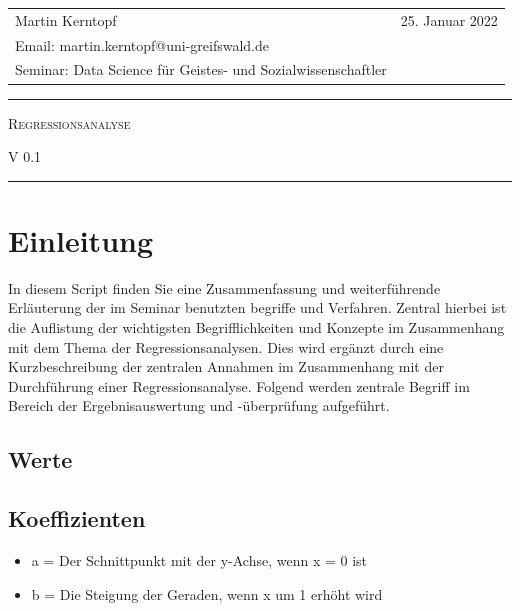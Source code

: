 \documentclass[10pt,a4paper]{article}
\begin{document}
\thispagestyle{empty}
\frenchspacing
\begin{flushleft}
\begin{tabular}{p{11.5cm} r}
Martin Kerntopf & 25. Januar 2022 \\
Email: martin.kerntopf@uni-greifswald.de \\
Seminar: Data Science für Geistes- und Sozialwissenschaftler 
\end{tabular}
\end{flushleft}
\hrule
\begin{center}
\vspace{0.4cm}
\large{\textsc{Regressionsanalyse}}

V 0.1

\vspace{0.4cm}
\end{center}
\hrule 
\frenchspacing

\tableofcontents

\section{Einleitung}
In diesem Script finden Sie eine Zusammenfassung und weiterführende Erläuterung der im Seminar benutzten begriffe und Verfahren. Zentral hierbei ist die Auflistung der wichtigsten Begrifflichkeiten und Konzepte im Zusammenhang mit dem Thema der Regressionsanalysen. Dies wird ergänzt durch eine Kurzbeschreibung der zentralen Annahmen im Zusammenhang mit der Durchführung einer Regressionsanalyse. Folgend werden zentrale Begriff im Bereich der Ergebnisauswertung und -überprüfung aufgeführt. %
    \subsection{Werte}
        \subsection{Koeffizienten}
            \begin{itemize}
                \item a = Der Schnittpunkt mit  der y-Achse, wenn x = 0 ist
                \item b = Die Steigung der Geraden, wenn x um 1 erhöht wird
            \end{itemize}
\end{document}
